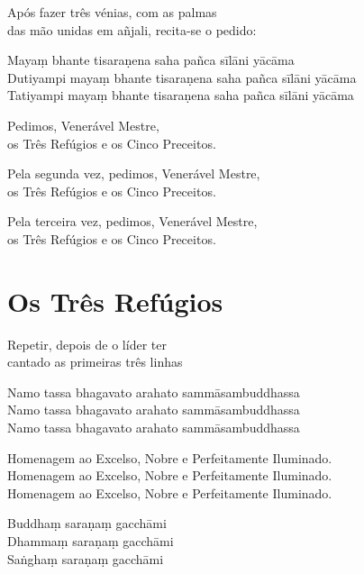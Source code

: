 {\setlength{\parindent}{0pt}%
\fontsize{10}{16}\selectfont%

\begin{instruction}
  Após fazer três vénias, com as palmas\\
  das mão unidas em añjali, recita-se o pedido:
\end{instruction}

Mayaṃ bhante tisaraṇena saha pañca sīlāni yācāma\\
Dutiyampi mayaṃ bhante tisaraṇena saha pañca sīlāni yācāma\\
Tatiyampi mayaṃ bhante tisaraṇena saha pañca sīlāni yācāma

\begin{english}
  Pedimos, Venerável Mestre,\\
  \vin os Três Refúgios e os Cinco Preceitos.

  Pela segunda vez, pedimos, Venerável Mestre,\\
  \vin os Três Refúgios e os Cinco Preceitos.

  Pela terceira vez, pedimos, Venerável Mestre,\\
  \vin os Três Refúgios e os Cinco Preceitos.
\end{english}

\section{Os Três Refúgios}

\begin{instruction}
  Repetir, depois de o líder ter\\
  cantado as primeiras três linhas
\end{instruction}

Namo tassa bhagavato arahato sammāsambuddhassa\\
Namo tassa bhagavato arahato sammāsambuddhassa\\
Namo tassa bhagavato arahato sammāsambuddhassa

\begin{english}
  Homenagem ao Excelso, Nobre e Perfeitamente Iluminado.\\
  Homenagem ao Excelso, Nobre e Perfeitamente Iluminado.\\
  Homenagem ao Excelso, Nobre e Perfeitamente Iluminado.
\end{english}

Buddhaṃ saraṇaṃ gacchāmi\\
Dhammaṃ saraṇaṃ gacchāmi\\
Saṅghaṃ saraṇaṃ gacchāmi

}
